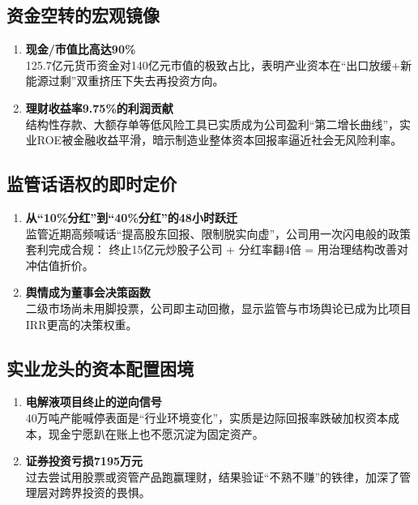 \subsection{资金空转的宏观镜像}
\begin{enumerate}[leftmargin=*, nosep]
    \item \textbf{现金/市值比高达90\%}  \\
    125.7亿元货币资金对140亿元市值的极致占比，表明产业资本在“出口放缓+新能源过剩”双重挤压下失去再投资方向。  
    \item \textbf{理财收益率9.75\%的利润贡献}  \\
    {\color{red}结构性存款、大额存单等低风险工具已实质成为公司盈利“第二增长曲线”，实业ROE被金融收益平滑，暗示制造业整体资本回报率逼近社会无风险利率。}
\end{enumerate}

\subsection{监管话语权的即时定价}
\begin{enumerate}[leftmargin=*, nosep]
    \item \textbf{从“10\%分红”到“40\%分红”的48小时跃迁}  \\
    {\color{red}监管近期高频喊话“提高股东回报、限制脱实向虚”}，公司用一次闪电般的政策套利完成合规：  
    终止15亿元炒股子公司 + 分红率翻4倍 = 用治理结构改善对冲估值折价。  
    \item \textbf{舆情成为董事会决策函数}  \\
    二级市场尚未用脚投票，公司即主动回撤，显示监管与市场舆论已成为比项目IRR更高的决策权重。
\end{enumerate}

\subsection{实业龙头的资本配置困境}
\begin{enumerate}[leftmargin=*, nosep]
    \item \textbf{电解液项目终止的逆向信号}  \\
    40万吨产能喊停表面是“行业环境变化”，实质是{\color{red}边际回报率跌破加权资本成本，现金宁愿趴在账上也不愿沉淀为固定资产。}
    \item \textbf{证券投资亏损7195万元}  \\
    过去尝试用股票或资管产品跑赢理财，结果验证{\color{red}“不熟不赚”的铁律}，加深了管理层对跨界投资的畏惧。
\end{enumerate}

